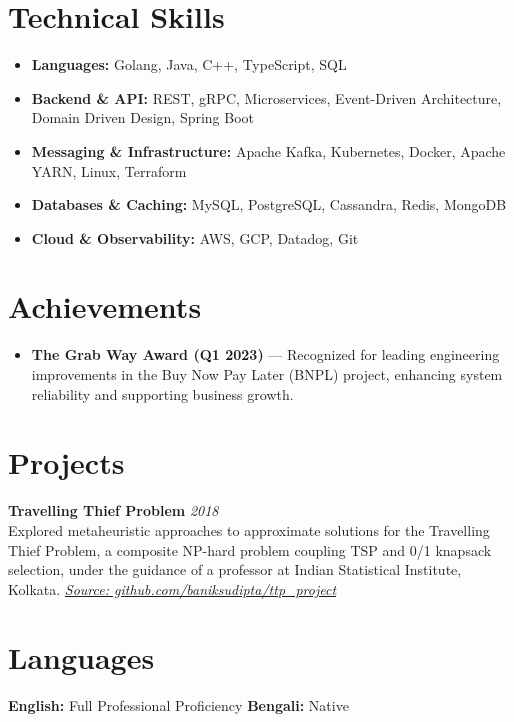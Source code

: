 \documentclass[11pt,a4paper]{article}
\begin{document}
\vspace{4pt}

\section{Technical Skills}
\begin{itemize}[leftmargin=*, noitemsep, parsep=2pt, itemsep=2pt]
    \item \textbf{Languages:} Golang, Java, C++, TypeScript, SQL
    \item \textbf{Backend \& API:} REST, gRPC, Microservices, Event-Driven Architecture, Domain Driven Design, Spring Boot
    \item \textbf{Messaging \& Infrastructure:} Apache Kafka, Kubernetes, Docker, Apache YARN, Linux, Terraform
    \item \textbf{Databases \& Caching:} MySQL, PostgreSQL, Cassandra, Redis, MongoDB
    \item \textbf{Cloud \& Observability:} AWS, GCP, Datadog, Git
\end{itemize}

\section{Achievements}
\begin{itemize}[leftmargin=*, noitemsep, topsep=1pt, label={\small\textbullet}]
    \item \textbf{The Grab Way Award (Q1 2023)} — Recognized for leading engineering improvements in the Buy Now Pay Later (BNPL) project, enhancing system reliability and supporting business growth.
\end{itemize}

\section{Projects}

\noindent\textbf{Travelling Thief Problem} \hfill \textit{2018} \\
Explored metaheuristic approaches to approximate solutions for the Travelling Thief Problem, a composite NP-hard problem coupling TSP and 0/1 knapsack selection, under the guidance of a professor at Indian Statistical Institute, Kolkata.
\hfill \href{https://github.com/baniksudipta/ttp_project}{\textit{Source: github.com/baniksudipta/ttp\_project}}

\section{Languages}
\textbf{English:} Full Professional Proficiency \quad \textbf{Bengali:} Native

\vfill
\end{document}

